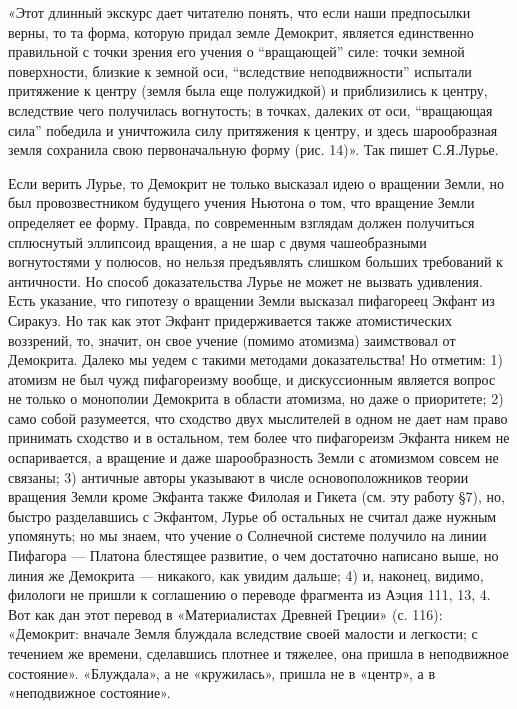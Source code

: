 «Этот длинный экскурс дает читателю  понять, что если наши предпосылки
верны,  то   та  форма,   которую  придал  земле   Демокрит,  является
единственно  правильной  с точки  зрения  его  учения о  ``вращающей''
силе:  точки земной  поверхности, близкие  к земной  оси, ``вследствие
неподвижности''  испытали   притяжение  к   центру  (земля   была  еще
полужидкой)  и  приблизились  к  центру,  вследствие  чего  получилась
вогнутость; в  точках, далеких от  оси, ``вращающая сила''  победила и
уничтожила  силу  притяжения  к  центру, и  здесь  шарообразная  земля
сохранила свою первоначальную форму (рис. 14)». Так пишет С.Я.Лурье.

Если  верить Лурье,  то Демокрит  не только  высказал идею  о вращении
Земли,  но был  провозвестником  будущего учения  Ньютона  о том,  что
вращение Земли  определяет ее  форму. Правда, по  современным взглядам
должен  получиться сплюснутый  эллипсоид вращения,  а не  шар с  двумя
чашеобразными вогнутостями  у полюсов,  но нельзя  предъявлять слишком
больших  требований к  античности. Но  способ доказательства  Лурье не
может не  вызвать удивления.  Есть указание,  что гипотезу  о вращении
Земли высказал  пифагореец Экфант из  Сиракуз. Но так как  этот Экфант
придерживается  также атомистических  воззрений, то,  значит, он  свое
учение (помимо атомизма)  заимствовал от Демокрита. Далеко  мы уедем с
такими методами  доказательства! Но  отметим: 1)  атомизм не  был чужд
пифагореизму  вообще,  и дискуссионным  является  вопрос  не только  о
монополии Демокрита в области атомизма,  но даже о приоритете; 2) само
собой разумеется,  что сходство  двух мыслителей в  одном не  дает нам
право  принимать сходство  и в  остальном, тем  более что  пифагореизм
Экфанта никем не оспаривается, а  вращение и даже шарообразность Земли
с атомизмом  совсем не связаны;  3) античные авторы указывают  в числе
основоположников теории  вращения Земли кроме Экфанта  также Филолая и
Гикета (см. эту работу §7),  но, быстро разделавшись с Экфантом, Лурье
об остальных не считал даже нужным  упомянуть; но мы знаем, что учение
о Солнечной системе  получило на линии Пифагора  --- Платона блестящее
развитие, о  чем достаточно написано  выше, но линия же  Демокрита ---
никакого, как увидим дальше; 4) и, наконец, видимо, филологи не пришли
к соглашению  о переводе фрагмента  из Аэция 111,  13, 4. Вот  как дан
этот  перевод в  «Материалистах Древней  Греции» (с.  116): «Демокрит:
вначале Земля блуждала вследствие своей малости и легкости; с течением
же времени,  сделавшись плотнее  и тяжелее,  она пришла  в неподвижное
состояние». «Блуждала»,  а не  «кружилась», пришла не  в «центр»,  а в
«неподвижное состояние».

